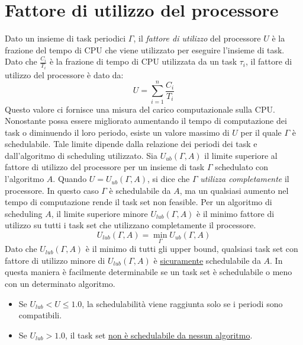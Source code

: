 \documentclass[12pt,openany,onesided]{book}
\begin{document}
\section{Fattore di utilizzo del processore}
Dato un insieme di task periodici $\Gamma$, il \textit{fattore di utilizzo} del processore $U$ è la frazione del tempo di CPU che viene utilizzato per eseguire l'insieme di task.
Dato che $\frac{C_i}{T_i}$ è la frazione di tempo di CPU utilizzata da un task $\tau_i$, il fattore di utilizzo del processore è dato da:
\begin{equation}
    U = \sum_{i=1}^{n} \frac{C_i}{T_i}
\end{equation}
Questo valore ci fornisce una misura del carico computazionale sulla CPU. Nonostante possa essere migliorato aumentando il tempo di computazione dei task o diminuendo il loro periodo, esiste un valore massimo 
di $U$ per il quale $\Gamma$ è schedulabile. Tale limite dipende dalla relazione dei periodi dei task e dall'algoritmo di scheduling utilizzato.
Sia $U_{ub}(\Gamma,A)$ il limite superiore al fattore di utilizzo del processore per un insieme di task $\Gamma$ schedulato con l'algoritmo $A$.
Quando $U = U_{ub}(\Gamma,A)$, si dice che $\Gamma$ \textit{utilizza completamente} il processore. In questo caso $\Gamma$ è schedulabile da $A$, ma un qualsiasi aumento nel tempo di computazione rende il task set non feasible.
Per un algoritmo di scheduling $A$, il limite superiore minore $U_{lub}(\Gamma,A)$ è il minimo fattore di utilizzo su tutti i task set che utilizzano completamente il processore.
\begin{equation}
    U_{lub}(\Gamma,A) = \min_{\Gamma } U_{ub}(\Gamma,A)
\end{equation}
Dato che $U_{lub}(\Gamma,A)$ è il minimo di tutti gli upper bound, qualsiasi task set con fattore di utilizzo minore di $U_{lub}(\Gamma,A)$ è \underline{sicuramente} schedulabile da $A$. In questa maniera 
è facilmente determinabile se un task set è schedulabile o meno con un determinato algoritmo. 
\begin{itemize}
    \item Se $ U_{lub}< U \leq 1.0$, la schedulabilità viene raggiunta solo se i periodi sono compatibili.
    \item Se $U_{lub} > 1.0 $, il task set \underline{non è schedulabile da nessun algoritmo}.
\end{itemize}
\end{document}

